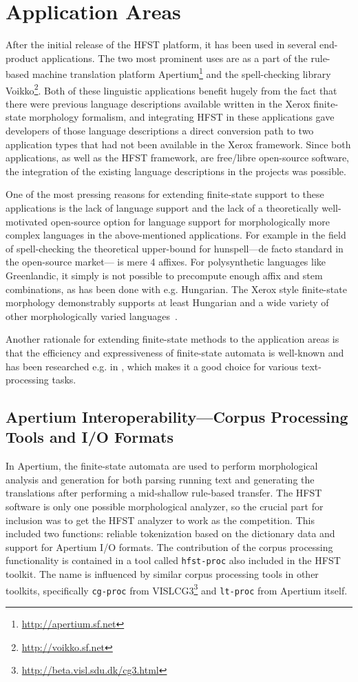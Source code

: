 \documentclass{llncs}
\begin{document}
\section{Application Areas}\label{hfst:application-areas}
After the initial release of the HFST platform, it has been used in several end-product
applications. The two most prominent uses are as a part of the rule-based
machine translation platform Apertium\footnote{\url{http://apertium.sf.net}}
and the spell-checking library Voikko\footnote{\url{http://voikko.sf.net}}. Both of
these linguistic applications benefit hugely from the fact that there
were previous language descriptions available written in the Xerox finite-state
morphology formalism, and integrating HFST in these applications gave
developers of those language descriptions a direct conversion path to two
application types that had not been available in the Xerox framework. Since
both applications, as well as the HFST framework, are free/libre open-source
software, the integration of the existing language descriptions in the
projects was possible.

One of the most pressing reasons for extending finite-state support to these
applications is the lack of language support and the lack of a theoretically well-motivated
open-source option for language support for morphologically more complex languages
in the above-mentioned applications. For example in the field of spell-checking the
theoretical upper-bound for hunspell---de facto standard in the open-source market---
is mere 4 affixes. For polysynthetic languages like Greenlandic, it simply is
not possible to precompute enough affix and stem combinations, as has been done with
e.g. Hungarian. The Xerox style finite-state morphology demonstrably supports
at least Hungarian and a wide variety of other morphologically varied
languages~\cite{beesley/2003}.

Another rationale for extending finite-state methods to the application areas
is that the efficiency and expressiveness of finite-state automata is
well-known and has been researched e.g. in \cite{aho/2007}, which makes it a good choice
for various text-processing tasks.

\subsection{Apertium Interoperability---Corpus Processing Tools and I/O Formats}
In Apertium, the finite-state automata are used to perform morphological analysis and generation for
both parsing running text and generating the translations after performing
a mid-shallow rule-based transfer. The HFST software is only one possible morphological analyzer, 
so the crucial part for inclusion was to get the HFST analyzer to work as the competition. 
This included two functions: reliable tokenization based on
the dictionary data and support for Apertium I/O formats. The 
contribution of the corpus processing functionality is contained in a tool
called \texttt{hfst-proc} also included in the HFST toolkit. The name is influenced by
similar corpus processing tools in other toolkits, specifically
\texttt{cg-proc} from VISLCG3\footnote{\url{http://beta.visl.sdu.dk/cg3.html}} and
\texttt{lt-proc} from Apertium itself.
\end{document}
